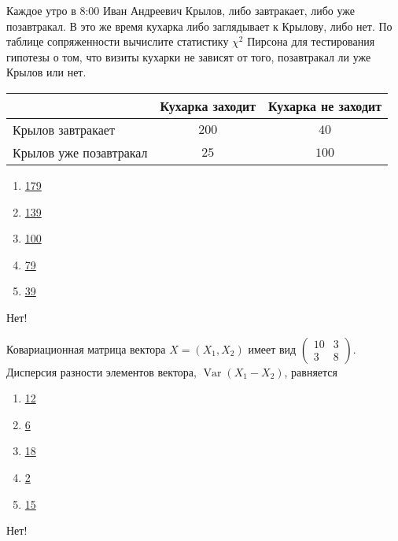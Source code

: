 \documentclass[t]{beamer}
\DeclareMathOperator{\Var}{Var}
\begin{document}
 \begin{frame} \label{16-No} 
\begin{block}{16} 

Каждое утро в 8:00 Иван Андреевич Крылов, либо завтракает, либо уже позавтракал. В это же время кухарка либо заглядывает к Крылову, либо нет. По таблице сопряженности вычислите  статистику $\chi^2$ Пирсона для тестирования гипотезы о том, что визиты кухарки не зависят от того, позавтракал ли уже Крылов или нет.

\begin{tabular}{@{}l|cc@{}}
\toprule
                       & Кухарка заходит & Кухарка не заходит \\ \midrule
Крылов завтракает      & $200$           & $40$               \\
Крылов уже позавтракал & $25$            & $100$              \\ \bottomrule
\end{tabular}

 


 \end{block} 
\begin{enumerate} 
\item[] \hyperlink{16-No}{\beamergotobutton{} 179}
\item[] \hyperlink{16-Yes}{\beamergotobutton{} 139}
\item[] \hyperlink{16-No}{\beamergotobutton{} 100}
\item[] \hyperlink{16-No}{\beamergotobutton{} 79}
\item[] \hyperlink{16-No}{\beamergotobutton{} 39}
\end{enumerate} 

 \alert{Нет!} 
\end{frame} 


 \begin{frame} \label{17-No} 
\begin{block}{17} 

Ковариационная матрица вектора $X=(X_1,X_2)$ имеет вид
$
\begin{pmatrix}
10 & 3 \\
3 & 8
\end{pmatrix}
$.
Дисперсия разности элементов вектора, $\Var(X_1-X_2)$, равняется
 


 \end{block} 
\begin{enumerate} 
\item[] \hyperlink{17-Yes}{\beamergotobutton{} 12}
\item[] \hyperlink{17-No}{\beamergotobutton{} 6}
\item[] \hyperlink{17-No}{\beamergotobutton{} 18}
\item[] \hyperlink{17-No}{\beamergotobutton{} 2}
\item[] \hyperlink{17-No}{\beamergotobutton{} 15}
\end{enumerate} 

 \alert{Нет!} 
\end{frame} 
\end{document}

